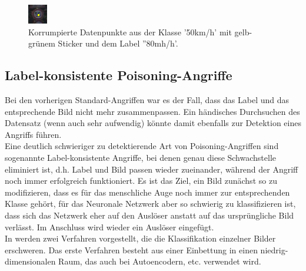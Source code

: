 \documentclass[11pt,a4paper]{article}
\numberwithin{equation}{section}
\begin{document}
	\begin{figure}[ht]
		\centering
		\includegraphics[width=0.15\textheight]{1450_poison.jpeg}
		
		
		\caption[Visualisierung des Standard-Angriffs]{Korrumpierte Datenpunkte aus der Klasse '50km/h' mit gelb-grünem Sticker und dem Label ''80mh/h'.}
		
		\label{im:SPA}
	\end{figure}
	
	
	\subsection{Label-konsistente Poisoning-Angriffe}
	Bei den vorherigen Standard-Angriffen war es der Fall, dass das Label und das entsprechende Bild nicht mehr zusammenpassen. Ein händisches Durchsuchen des Datensatz (wenn auch sehr aufwendig) könnte damit ebenfalls zur Detektion eines Angriffs führen.\\
	Eine deutlich schwieriger zu detektierende Art von Poisoning-Angriffen sind sogenannte Label-konsistente Angriffe, bei denen genau diese Schwachstelle eliminiert ist, d.h. Label und Bild passen wieder zueinander, während der Angriff noch immer erfolgreich funktioniert. Es ist das Ziel, ein Bild zunächst so zu modifizieren, dass es für das menschliche Auge noch immer zur entsprechenden Klasse gehört, für das Neuronale Netzwerk aber so schwierig zu klassifizieren ist, dass sich das Netzwerk eher auf den Auslöser anstatt auf das ursprüngliche Bild verlässt. Im Anschluss wird wieder ein Auslöser eingefügt.\\
	
	In \cite{labelconsistent} werden zwei Verfahren vorgestellt, die die Klassifikation einzelner Bilder erschweren. Das erste Verfahren besteht aus einer Einbettung in einen niedrig-dimensionalen Raum, das auch bei Autoencodern, etc. verwendet wird.
	
\end{document}
